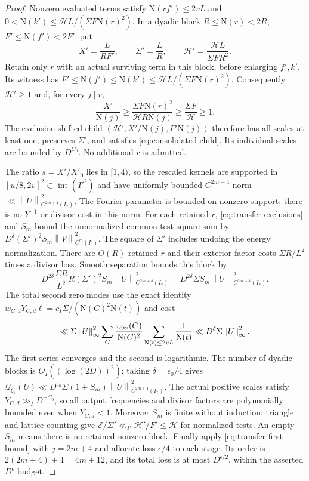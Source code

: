 \documentclass[11pt]{article}
\numberwithin{equation}{section}
\theoremstyle{definition}
\theoremstyle{remark}
\newcommand{\E}{\mathcal E}
\newcommand{\N}{\mathrm N}
\newcommand{\norm}[1]{\left\|#1\right\|}
\begin{document}
\begin{proof}
Nonzero evaluated terms satisfy $\N(rf')\le2vL$ and
$0<\N(k')\le\mathcal HL/(\Sigma F\N(r)^2)$.
In a dyadic block $R\le\N(r)<2R$, $F'\le\N(f')<2F'$, put
\[
 X'=\frac L{RF'},\qquad\Sigma'=\frac LR,\qquad
 \mathcal H'=\frac{\mathcal HL}{\Sigma FR^2}.
\]
Retain only $r$ with an actual surviving term in this block, before
enlarging $f',k'$. Its witness has
$F'\le\N(f')\le\N(k')\le\mathcal HL/(\Sigma F\N(r)^2)$.
Consequently $\mathcal H'\ge1$ and, for every $j\mid r$,
\[
 \frac{X'}{\N(j)}\ge
 \frac{\Sigma F\N(r)^2}{\mathcal HR\N(j)}
 \ge\frac{\Sigma F}{\mathcal H}\ge1.
\]
The exclusion-shifted child
$(\mathcal H',X'/\N(j),F'\N(j))$ therefore has all scales at least one,
preserves $\Sigma'$, and satisfies \eqref{eq:consolidated-child}.
Its individual scales are bounded by $D^{C_0}$. No additional $r$ is admitted.

The ratio $s=X'/X'_0$ lies in $[1,4)$, so the rescaled kernels are supported
in $[u/8,2v]^2\subset\operatorname{int}(I'^2)$ and have uniformly bounded
$C^{2m+4}$ norm $\ll\norm{U}_{C^{2m+4}(I_*)}^2$. The Fourier parameter
is bounded on nonzero support; there is no $Y^{-1}$ or divisor cost in this norm.
For each retained $r$, \eqref{eq:transfer-exclusions} and $S_m$ bound the
unnormalized common-test square sum by
$D^\delta(\Sigma')^2S_m\norm{V}_{C^m(I')}^2$.
The square of $\Sigma'$ includes undoing the energy normalization.
There are $O(R)$ retained $r$ and their exterior factor costs
$\Sigma R/L^2$ times a divisor loss. Smooth separation bounds this block by
\[
 D^{2\delta}\frac{\Sigma R}{L^2}R(\Sigma')^2S_m
 \norm{U}_{C^{2m+4}(I_*)}^2
 =D^{2\delta}\Sigma S_m\norm{U}_{C^{2m+4}(I_*)}^2.
\]
The total second zero modes use the exact identity
$w_{C,d}Y_{C,d}\ell=c_I\Sigma/(\N(C)^2\N(t))$ and cost
\[
 \ll\Sigma\norm{U}_\infty^2
 \sum_C\frac{\tau_{\rm div}(C)}{\N(C)^2}
 \sum_{\N(t)\le2vL}\frac1{\N(t)}
 \ll D^\delta\Sigma\norm{U}_\infty^2.
\]
The first series converges and the second is logarithmic. The number of
dyadic blocks is $O_I((\log(2D))^2)$; taking $\delta=\epsilon_0/4$ gives
$\mathcal Q_{\xi_1}(U)\ll D^{\epsilon_0}\Sigma(1+S_m)
\norm{U}_{C^{2m+4}(I_*)}^2$.
The actual positive scales satisfy $Y_{C,d}\gg_I D^{-C_0}$, so all output
frequencies and divisor factors are polynomially bounded even when $Y_{C,d}<1$.
Moreover $S_m$ is finite without induction: triangle and lattice counting give
$\E/\Sigma'\ll_{I'}\mathcal H'/F'\le\mathcal H$ for normalized tests.
An empty $S_m$ means there is no retained nonzero block.
Finally apply \eqref{eq:transfer-first-bound} with $j=2m+4$ and allocate
loss $\epsilon/4$ to each stage. Its order is
$2(2m+4)+4=4m+12$, and its total loss is at most $D^{\epsilon/2}$,
within the asserted $D^\epsilon$ budget.
\end{proof}
\end{document}
